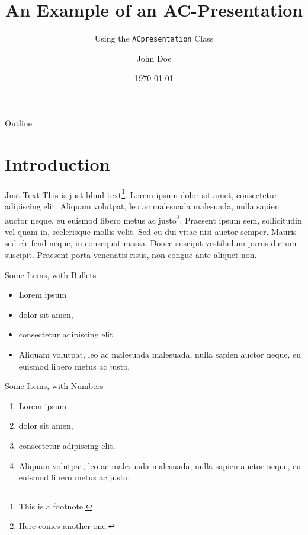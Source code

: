 \documentclass[aspectratio=169]{ACpresentation}
\title{An Example of an AC-Presentation}
\subtitle{Using the \texttt{ACpresentation} Class}
\author{John Doe}
\institute{
  Analytic Computing\\
  University of Stuttgart\\
  \texttt{\mailto{johndoe@ipvs.uni-stuttgart.de}}
}
\date{\today}
\begin{document}
\miniframesoff %
\begin{frame}[ACfancy]
  \titlepage
\end{frame}

\newcommand*\ACheadline{} %
\begin{frame}{Outline}
  \tableofcontents
\end{frame}
\let\ACheadline\relax %
\miniframeson %


\section{Introduction}

\begin{frame}{Just Text}
  This is just blind text\footnote{This is a footnote.}.
  Lorem ipsum dolor sit amet, consectetur adipiscing elit.
  Aliquam volutpat, leo ac malesuada malesuada, nulla sapien auctor neque, eu
  euismod libero metus ac justo\footnote{Here comes another one.}.
  Praesent ipsum sem, sollicitudin vel quam in, scelerisque mollis velit.
  Sed eu dui vitae nisi auctor semper.
  Mauris sed eleifend neque, in consequat massa.
  Donec suscipit vestibulum purus dictum suscipit.
  Praesent porta venenatis risus, non congue ante aliquet non.
\end{frame}

\begin{frame}{Some Items, with Bullets}
  \begin{itemize}
    \item Lorem ipsum
    \item dolor sit amen,
    \item consectetur adipiscing elit.
    \item Aliquam volutpat, leo ac malesuada malesuada, nulla sapien auctor
      neque, eu euismod libero metus ac justo.
  \end{itemize}
\end{frame}

\begin{frame}{Some Items, with Numbers}
  \begin{enumerate}
    \item Lorem ipsum
    \item dolor sit amen,
    \item consectetur adipiscing elit.
    \item Aliquam volutpat, leo ac malesuada malesuada, nulla sapien auctor
      neque, eu euismod libero metus ac justo.
  \end{enumerate}
\end{frame}
\end{document}
